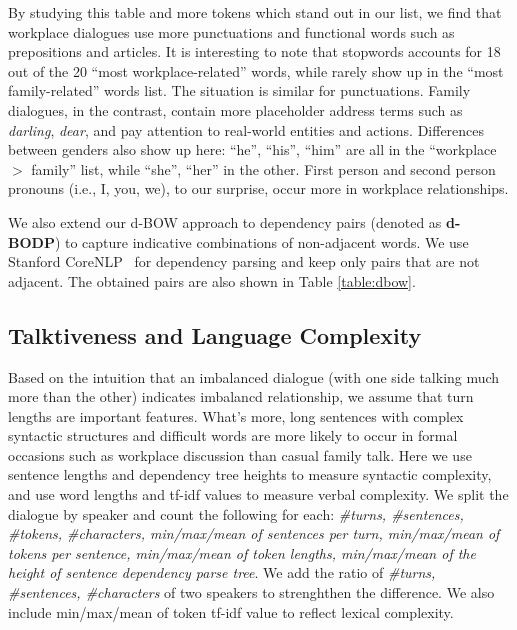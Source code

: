 By studying this table and more tokens which stand out in our list, 
we find that workplace dialogues use more punctuations and functional 
words such as prepositions and articles. 
It is interesting to note that stopwords accounts for 18 out of the 
20 ``most workplace-related'' words, while rarely show up in the ``most family-related'' words list. The situation is similar for punctuations.
Family dialogues, in the contrast, contain more placeholder address terms such as  \textit{darling}, \textit{dear}, and pay attention to real-world entities and actions. Differences between genders also show up here: ``he'', ``his'', ``him'' are all in the ``workplace $>$ family'' list, while ``she'', ``her'' in the other. First person and second person pronouns (i.e., I, you, we), 
to our surprise, occur more in workplace relationships. 

We also extend our d-BOW approach to dependency pairs 
(denoted as \textbf{d-BODP}) to capture indicative combinations of 
non-adjacent words. We use Stanford CoreNLP~\cite{stanfordcorenlp} 
for dependency parsing and keep only pairs that are not adjacent. 
The obtained pairs are also shown in Table \ref{table:dbow}.

\subsection*{Talktiveness and Language Complexity}
Based on the intuition that an imbalanced dialogue 
(with one side talking much more than the other) 
indicates imbalancd relationship, we assume that turn lengths are 
important features. What's more, long sentences with complex 
syntactic structures and difficult words are more 
likely to occur in formal occasions such as workplace discussion
than casual family talk. 
Here we use sentence lengths and dependency tree heights to measure 
syntactic complexity, 
and use word lengths and tf-idf values to measure verbal complexity. 
We split the dialogue by speaker and count the following for 
each: \textit{\#turns, \#sentences, \#tokens, \#characters, min/max/mean of sentences per turn, 
min/max/mean of tokens per sentence, min/max/mean of token lengths, min/max/mean of the 
height of sentence dependency parse tree}. We add the ratio of \textit{\#turns, \#sentences, \#characters} of two speakers to strenghthen the difference. 
We also include min/max/mean of token tf-idf value to 
reflect lexical complexity.


